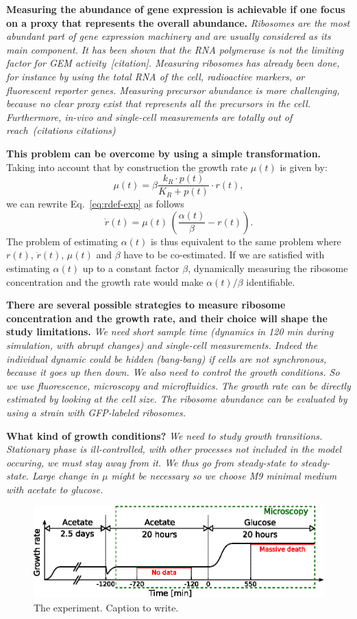 \textbf{Measuring the abundance of gene expression is achievable if one focus on a proxy that represents the overall abundance.}
\textit{
Ribosomes are the most abundant part of gene expression machinery and are usually considered as its main component.
It has been shown that the RNA polymerase is not the limiting factor for GEM activity~[citation].
Measuring ribosomes has already been done, for instance by using the total RNA of the cell, radioactive markers, or fluorescent reporter genes.
Measuring precursor abundance is more challenging, because no clear proxy exist that represents all the precursors in the cell.
Furthermore, in-vivo and single-cell measurements are totally out of reach~(citations citations)}

\textbf{This problem can be overcome by using a simple transformation.}
Taking into account that by construction the growth rate  $\mu(t)$ is given by:
\[
	\mu (t) = \beta \frac{k_R \cdot p(t)}{K_R + p(t)} \cdot r(t),
\]
we can rewrite Eq.~\ref{eq:rdef-exp} as follows
\[
\dot{r}(t) = \mu (t) \, \left(\frac{\alpha(t)}{\beta} - r(t) \right).
\]
The problem of estimating $\alpha(t)$ is thus equivalent to the same problem where $r(t)$, $\dot{r}(t)$, $\mu (t)$ and $\beta$ have to be co-estimated.
If we are satisfied with estimating $\alpha (t)$ up to a constant factor $\beta$, dynamically measuring the ribosome concentration and the growth rate would make $\alpha (t) / \beta$ identifiable.

\textbf{There are several possible strategies to measure ribosome concentration and the growth rate, and their choice will shape the study limitations.}
\textit{
We need short sample time (dynamics in 120 min during simulation, with abrupt changes) and single-cell measurements.
Indeed the individual dynamic could be hidden (bang-bang) if cells are not synchronous, because it goes up then down.
We also need to control the growth conditions.
So we use fluorescence, microscopy and microfluidics.
The growth rate can be directly estimated by looking at the cell size.
The ribosome abundance can be evaluated by using a strain with GFP-labeled ribosomes.
}

\textbf{What kind of growth conditions?}
\textit{
We need to study growth transitions.
Stationary phase is ill-controlled, with other processes not included in the model occuring, we must stay away from it.
We thus go from steady-state to steady-state.
Large change in $\mu$ might be necessary so we choose M9 minimal medium with acetate to glucose.
}

\begin{figure}[h!]
\centering
\includegraphics[scale=1]{./Fig/experiment_schema.eps}
\caption{The experiment. Caption to write.}
\label{fig:experiment_schema}
\end{figure}

